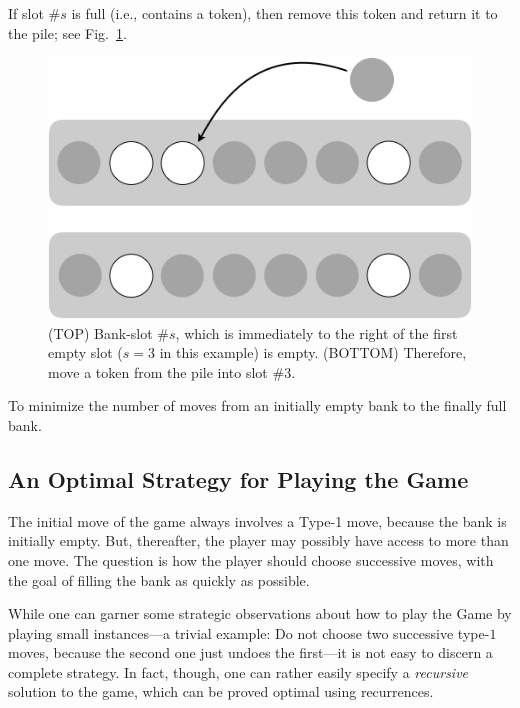 \begin{enumerate}
If slot \#$s$ is full (i.e., contains a token), then remove this token
and return it to the pile; see Fig.~\ref{fig:rule2}.
\begin{figure}[htb]
\begin{center}
        \includegraphics[scale=0.3]{FiguresMaths/GameTokenRule2.png}
\caption{(TOP) Bank-slot \#$s$, which is immediately to the right of
  the first empty slot ($s=3$ in this example) is empty.  (BOTTOM)
  Therefore, move a token from the pile into slot \#$3$.}
        \label{fig:rule2}
\end{center}
\end{figure}
\end{enumerate}

\medskip

 To minimize the
number of moves from an initially empty bank to the finally full bank.



\subsection{An Optimal Strategy for Playing the Game}
\label{sec:Token-Game-Strategies}

The initial move of the game always involves a Type-1 move, because
the bank is initially empty.  But, thereafter, the player may possibly
have access to more than one move.  The question is how the player
should choose successive moves, with the goal of filling the bank as
quickly as possible.

While one can garner some strategic observations about how to play the
Game by playing small instances---a trivial example: Do not choose two
successive type-$1$ moves, because the second one just undoes the
first---it is not easy to discern a complete strategy.  In fact,
though, one can rather easily specify a {\em recursive} solution to
the game, which can be proved optimal using recurrences.


